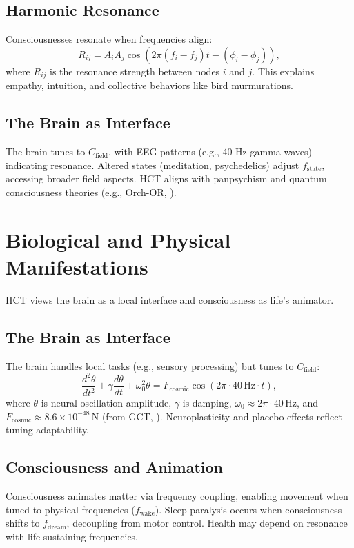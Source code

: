 \documentclass[a4paper,12pt]{article}
\begin{document}
\subsection{Harmonic Resonance}
Consciousnesses resonate when frequencies align:
\begin{equation}
R_{ij} = A_i A_j \cos(2\pi (f_i - f_j) t - (\phi_i - \phi_j)),
\label{eq:resonance}
\end{equation}
where $R_{ij}$ is the resonance strength between nodes $i$ and $j$. This explains empathy, intuition, and collective behaviors like bird murmurations.

\subsection{The Brain as Interface}
The brain tunes to $C_{\text{field}}$, with EEG patterns (e.g., 40 Hz gamma waves) indicating resonance. Altered states (meditation, psychedelics) adjust $f_{\text{state}}$, accessing broader field aspects. HCT aligns with panpsychism and quantum consciousness theories (e.g., Orch-OR, \cite{PenroseHameroff1996}).

\section{Biological and Physical Manifestations}
\label{sec:bio_phys}
HCT views the brain as a local interface and consciousness as life’s animator.

\subsection{The Brain as Interface}
The brain handles local tasks (e.g., sensory processing) but tunes to $C_{\text{field}}$:
\begin{equation}
\frac{d^2 \theta}{dt^2} + \gamma \frac{d \theta}{dt} + \omega_0^2 \theta = F_{\text{cosmic}} \cos(2\pi \cdot 40 \, \text{Hz} \cdot t),
\label{eq:neural_resonance}
\end{equation}
where $\theta$ is neural oscillation amplitude, $\gamma$ is damping, $\omega_0 \approx 2\pi \cdot 40 \, \text{Hz}$, and $F_{\text{cosmic}} \approx 8.6 \times 10^{-48} \, \text{N}$ (from GCT, \cite{Wright2025GCT}). Neuroplasticity and placebo effects reflect tuning adaptability.

\subsection{Consciousness and Animation}
Consciousness animates matter via frequency coupling, enabling movement when tuned to physical frequencies ($f_{\text{wake}}$). Sleep paralysis occurs when consciousness shifts to $f_{\text{dream}}$, decoupling from motor control. Health may depend on resonance with life-sustaining frequencies.
\end{document}
